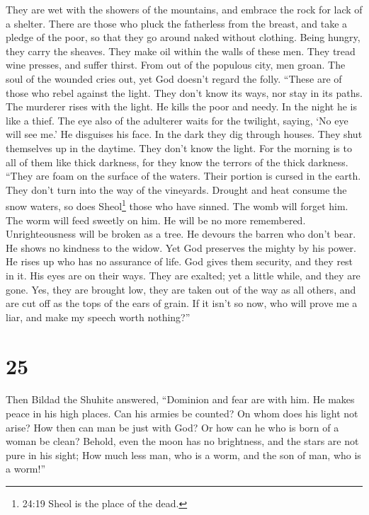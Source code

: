  They are wet with the showers of the mountains, and embrace
the rock for lack of a shelter.  There are those who pluck
the fatherless from the breast, and take a pledge of the poor,
 so that they go around naked without clothing. Being
hungry, they carry the sheaves.  They make oil within the
walls of these men. They tread wine presses, and suffer thirst.
 From out of the populous city, men groan. The soul of the
wounded cries out, yet God doesn't regard the folly. 
``These are of those who rebel against the light. They don't know its
ways, nor stay in its paths.  The murderer rises with the
light. He kills the poor and needy. In the night he is like a thief.
 The eye also of the adulterer waits for the twilight,
saying, `No eye will see me.' He disguises his face.  In
the dark they dig through houses. They shut themselves up in the
daytime. They don't know the light.  For the morning is to
all of them like thick darkness, for they know the terrors of the thick
darkness.  ``They are foam on the surface of the waters.
Their portion is cursed in the earth. They don't turn into the way of
the vineyards.  Drought and heat consume the snow waters,
so does Sheol\footnote{24:19 Sheol is the place of the dead.} those who
have sinned.  The womb will forget him. The worm will feed
sweetly on him. He will be no more remembered. Unrighteousness will be
broken as a tree.  He devours the barren who don't bear. He
shows no kindness to the widow.  Yet God preserves the
mighty by his power. He rises up who has no assurance of life.
 God gives them security, and they rest in it. His eyes are
on their ways.  They are exalted; yet a little while, and
they are gone. Yes, they are brought low, they are taken out of the way
as all others, and are cut off as the tops of the ears of grain.
 If it isn't so now, who will prove me a liar, and make my
speech worth nothing?''

\hypertarget{section-18}{%
\section{25}\label{section-18}}

 Then Bildad the Shuhite answered,  ``Dominion
and fear are with him. He makes peace in his high places. 
Can his armies be counted? On whom does his light not arise?
 How then can man be just with God? Or how can he who is
born of a woman be clean?  Behold, even the moon has no
brightness, and the stars are not pure in his sight;  How
much less man, who is a worm, and the son of man, who is a worm!''


